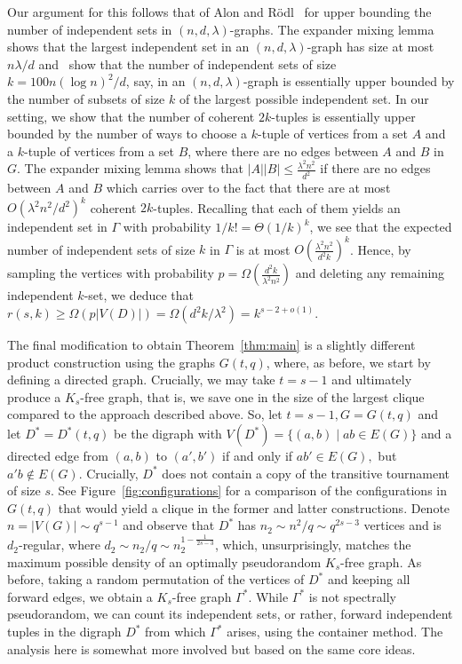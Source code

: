 \documentclass{article}
\theoremstyle{plain}
\theoremstyle{definition}
\begin{document}
    Our argument for this follows that of Alon and R\"{o}dl~\cite{alon-rodl} for upper bounding the number of independent sets in $(n, d, \lambda)$-graphs. The expander mixing lemma shows that the largest independent set in an $(n, d, \lambda)$-graph has size at most $n \lambda / d$ and~\cite{alon-rodl} show that the number of independent sets of size $k = 100 n (\log n)^2 / d$, say, in an $(n, d, \lambda)$-graph is essentially upper bounded by the number of subsets of size $k$ of the largest possible independent set. In our setting, we show that the number of coherent $2k$-tuples is essentially upper bounded by the number of ways to choose a $k$-tuple of vertices from a set $A$ and a $k$-tuple of vertices from a set $B$, where there are no edges between $A$ and $B$ in $G$. The expander mixing lemma shows that $|A||B| \le \frac{\lambda^2 n^2}{d^2}$ if there are no edges between $A$ and $B$ which carries over to the fact that there are at most $O(\lambda^2 n^2 / d^2)^k$ coherent $2k$-tuples. Recalling that each of them yields an independent set in $\Gamma$ with probability $1/k! = \Theta(1/k)^k$, we see that the expected number of independent sets of size $k$ in $\Gamma$ is at most $O\left( \frac{\lambda^2 n^2}{d^2 k}\right)^k$. Hence, by sampling the vertices with probability $p = \Omega(\frac{d^2 k}{\lambda^2 n^2})$ and deleting any remaining independent $k$-set, we deduce that $r(s, k) \ge \Omega(p |V(D)|) = \Omega(d^2 k / \lambda^2) = k^{s-2+o(1)}$.
    
    The final modification to obtain Theorem~\ref{thm:main} is a slightly different product construction using the graphs $G(t, q)$, where, as before, we start by defining a directed graph. Crucially, we may take $t = s-1$ and ultimately produce a $K_s$-free graph, that is, we save one in the size of the largest clique compared to the approach described above. So, let $t=s-1, G = G(t, q)$ and let $D^* = D^*(t, q)$ be the digraph with $V(D^*) = \{ (a, b) \mid ab \in E(G)\}$ and a directed edge from $(a, b)$ to $(a', b')$ if and only if $ab' \in E(G),$ but $a' b \not\in E(G)$. Crucially, $D^*$ does not contain a copy of the transitive tournament of size $s$. See Figure~\ref{fig:configurations} for a comparison of the configurations in $G(t, q)$ that would yield a clique in the former and latter constructions. Denote $n = |V(G)| \sim q^{s-1}$ and observe that $D^*$ has $n_2 \sim n^2 / q \sim q^{2s-3}$ vertices and is $d_2$-regular, where $d_2 \sim n_2 / q \sim n_2^{1 - \frac{1}{2s-3}}$, which, unsurprisingly, matches the maximum possible density of an optimally pseudorandom $K_s$-free graph. As before, taking a random permutation of the vertices of $D^*$ and keeping all forward edges, we obtain a $K_s$-free graph $\Gamma^*$. While $\Gamma^*$ is not spectrally pseudorandom, we can count its independent sets, or rather, forward independent tuples in the digraph $D^*$ from which $\Gamma^*$ arises, using the container method. The analysis here is somewhat more involved but based on the same core ideas.
    
\end{document}
